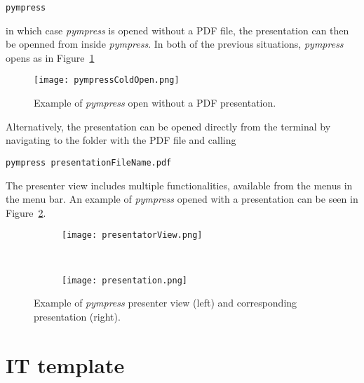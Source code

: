 \begin{verbatim}
pympress
\end{verbatim}
in which case \textit{pympress} is opened without a PDF file, the presentation can then be openned from inside \textit{pympress}.
In both of the previous situations, \textit{pympress} opens as in Figure~\ref{fig:pympressColdOpen}
\begin{figure}[h]
\centering
\texttt{[image: pympressColdOpen.png]}
\caption{Example of \textit{pympress} open without a PDF presentation.}
\label{fig:pympressColdOpen}
\end{figure}
\par
Alternatively, the presentation can be opened directly from the terminal by navigating to the folder with the PDF file and calling
\begin{verbatim}
pympress presentationFileName.pdf
\end{verbatim}
The presenter view includes multiple functionalities, available from the menus in the menu bar. An example of \textit{pympress} opened with a presentation can be seen in Figure~\ref{fig:pympressPresentation}.
\begin{figure}[h]
\centering
\begin{subfigure}{.49\linewidth}
\texttt{[image: presentatorView.png]}
\end{subfigure} ~
\begin{subfigure}{.49\linewidth}
\texttt{[image: presentation.png]}
\end{subfigure}
\caption{Example of \textit{pympress} presenter view (left) and corresponding presentation (right).}
\label{fig:pympressPresentation}
\end{figure}
	

\section{IT template}
